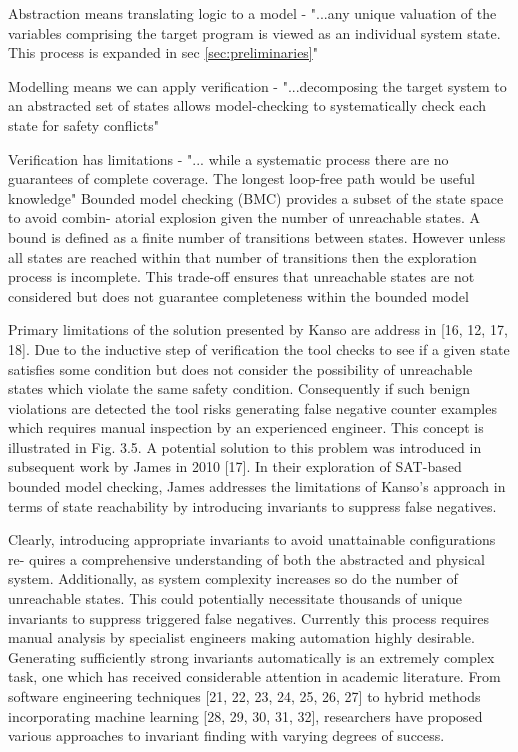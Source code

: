 \documentclass[runningheads]{llncs}
\begin{document}
Abstraction means translating logic to a model - "...any unique valuation of the variables comprising the target program is viewed as an individual system state. This process is expanded in sec \ref{sec:preliminaries}"

Modelling means we can apply verification - "...decomposing the target system to an abstracted set of states allows model-checking to systematically check each state for safety conflicts"

Verification has limitations - "... while a systematic process there are no guarantees of complete coverage. The longest loop-free path would be useful knowledge"
Bounded model checking (BMC) provides a subset of the state space to avoid combin-
atorial explosion given the number of unreachable states. A bound is defined as a finite
number of transitions between states. However unless all states are reached within that
number of transitions then the exploration process is incomplete. This trade-off ensures
that unreachable states are not considered but does not guarantee completeness within
the bounded model

Primary limitations of the solution presented by Kanso are address in [16, 12, 17, 18].
Due to the inductive step of verification the tool checks to see if a given state satisfies
some condition but does not consider the possibility of unreachable states which violate
the same safety condition. Consequently if such benign violations are detected the tool
risks generating false negative counter examples which requires manual inspection by an
experienced engineer. This concept is illustrated in Fig. 3.5. A potential solution to this
problem was introduced in subsequent work by James in 2010 [17]. In their exploration of
SAT-based bounded model checking, James addresses the limitations of Kanso’s approach
in terms of state reachability by introducing invariants to suppress false negatives.

Clearly, introducing appropriate invariants to avoid unattainable configurations re-
quires a comprehensive understanding of both the abstracted and physical system.
Additionally, as system complexity increases so do the number of unreachable states. This
could potentially necessitate thousands of unique invariants to suppress triggered false
negatives. Currently this process requires manual analysis by specialist engineers making
automation highly desirable. Generating sufficiently strong invariants automatically is
an extremely complex task, one which has received considerable attention in academic
literature. From software engineering techniques [21, 22, 23, 24, 25, 26, 27] to hybrid
methods incorporating machine learning [28, 29, 30, 31, 32], researchers have proposed
various approaches to invariant finding with varying degrees of success. 
\end{document}
